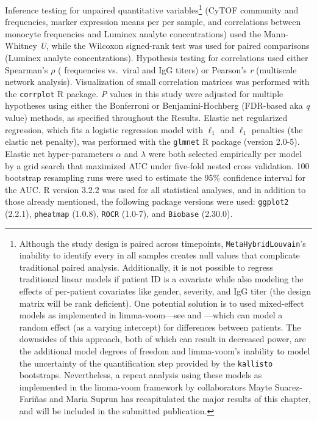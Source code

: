 Inference testing for unpaired quantitative variables\footnote{Although the study design is paired across timepoints, \texttt{MetaHybridLouvain}'s inability to identify every \subcommunity{} in all samples creates null values that complicate traditional paired analysis. Additionally, it is not possible to regress traditional linear models if patient ID is a covariate while also modeling the effects of per-patient covariates like gender, severity, and IgG titer (the design matrix will be rank deficient). One potential solution is to used mixed-effect models as implemented in limma-voom—see \textcite{Ritchie2015} and \textcite{Law2014}—which can model a random effect (as a varying intercept) for differences between patients. The downsides of this approach, both of which can result in decreased power, are the additional model degrees of freedom and limma-voom's inability to model the uncertainty of the quantification step provided by the \texttt{kallisto} bootstraps. Nevertheless, a repeat analysis using these models as implemented in the limma-voom framework by collaborators Mayte Suarez-Fariñas and Maria Suprun has recapitulated the major results of this chapter, and will be included in the submitted publication.} (CyTOF community and \subcommunity{} frequencies, marker expression means per \subcommunity{} per sample, and correlations between monocyte \subcommunity{} frequencies and Luminex analyte concentrations) used the Mann-Whitney \emph{U}, while the Wilcoxon signed-rank test was used for paired comparisons (Luminex analyte concentrations). Hypothesis testing for correlations used either Spearman's $\rho$ (\subcommunity{} frequencies vs.\ viral and IgG titers) or Pearson’s \emph{r} (multiscale network analysis). Visualization of small correlation matrices was performed with the \texttt{corrplot} R package. \emph{P} values in this study were adjusted for multiple hypotheses using either the Bonferroni or Benjamini-Hochberg (FDR-based aka \emph{q} value) methods, as specified throughout the Results. Elastic net regularized regression, which fits a logistic regression model with $\ell_1$ and $\ell_1$ penalties (the elastic net penalty), was performed with the \texttt{glmnet}\autocite{Friedman2010} R package (version 2.0-5). Elastic net hyper-parameters $\alpha$ and $\lambda$ were both selected empirically per model by a grid search that maximized AUC under five-fold nested cross validation. 100 bootstrap resampling runs were used to estimate the 95\% confidence interval for the AUC. R version 3.2.2 was used for all statistical analyses, and in addition to those already mentioned, the following package versions were used: \texttt{ggplot2} (2.2.1), \texttt{pheatmap} (1.0.8), \texttt{ROCR}\autocite{Sing2005} (1.0-7), and \texttt{Biobase} (2.30.0).

